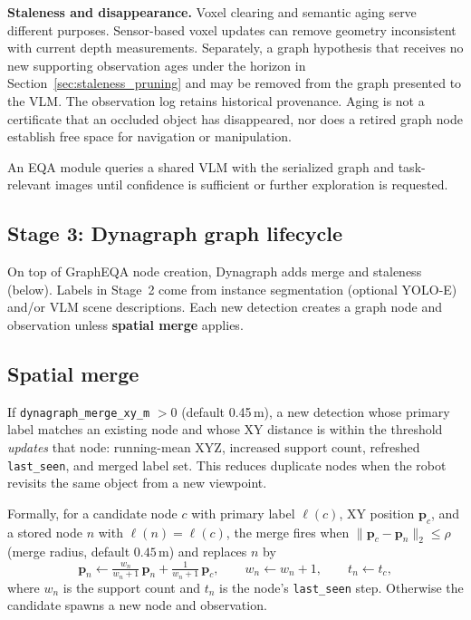 \textbf{Staleness and disappearance.} Voxel clearing and semantic aging serve
different purposes. Sensor-based voxel updates can remove geometry inconsistent
with current depth measurements. Separately, a graph hypothesis that receives no
new supporting observation ages under the horizon in
Section~\ref{sec:staleness_pruning} and may be removed from the graph presented to
the VLM. The observation log retains historical provenance. Aging is not a
certificate that an occluded object has disappeared, nor does a retired graph
node establish free space for navigation or manipulation.

An EQA module queries a shared VLM with the serialized graph and task-relevant images until confidence is sufficient or further exploration is requested.

\subsection{Stage 3: Dynagraph graph lifecycle}

On top of GraphEQA node creation, Dynagraph adds merge and staleness (below).
Labels in Stage~2 come from instance segmentation (optional YOLO-E) and/or VLM scene descriptions.
Each new detection creates a graph node and observation unless \textbf{spatial merge} applies.

\subsection{Spatial merge}
\label{sec:spatial_merge}

If \texttt{dynagraph\_merge\_xy\_m} $> 0$ (default 0.45\,m), a new detection whose primary label matches an existing node and whose XY distance is within the threshold \emph{updates} that node: running-mean XYZ, increased support count, refreshed \texttt{last\_seen}, and merged label set.
This reduces duplicate nodes when the robot revisits the same object from a new viewpoint.

Formally, for a candidate node $c$ with primary label $\ell(c)$, XY position $\mathbf{p}_c$, and a stored node $n$ with $\ell(n)=\ell(c)$, the merge fires when $\lVert \mathbf{p}_c - \mathbf{p}_n \rVert_2 \le \rho$ (merge radius, default $0.45$\,m) and replaces $n$ by
\begin{equation}
  \mathbf{p}_n \leftarrow \tfrac{w_n}{w_n+1}\,\mathbf{p}_n + \tfrac{1}{w_n+1}\,\mathbf{p}_c, \qquad
  w_n \leftarrow w_n + 1, \qquad
  t_n \leftarrow t_c,
\end{equation}
where $w_n$ is the support count and $t_n$ is the node's \texttt{last\_seen} step.
Otherwise the candidate spawns a new node and observation.

